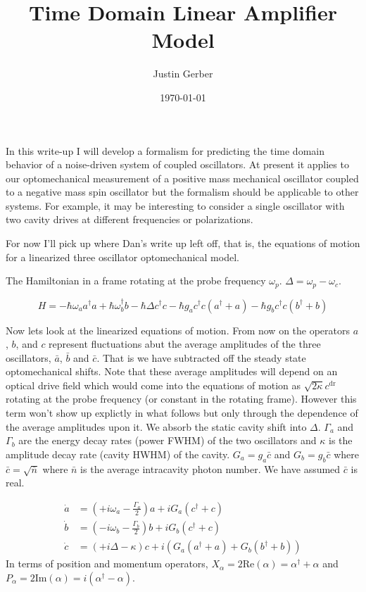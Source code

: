\documentclass[12pt]{article}
\begin{document}
\title{Time Domain Linear Amplifier Model}
\author{Justin Gerber}
\date{\today}
\maketitle

In this write-up I will develop a formalism for predicting the time domain behavior of a noise-driven system of coupled oscillators. At present it applies to our optomechanical measurement of a positive mass mechanical oscillator coupled to a negative mass spin oscillator but the formalism should be applicable to other systems. For example, it may be interesting to consider a single oscillator with two cavity drives at different frequencies or polarizations.


For now I'll pick up where Dan's write up left off, that is, the equations of motion for a linearized three oscillator optomechanical model.

The Hamiltonian in a frame rotating at the probe frequency $\omega_p$. $\Delta = \omega_p-\omega_c$.

\begin{equation}
H = -\hbar \omega_a a^{\dag} a + \hbar \omega_b^{\dag}b - \hbar\Delta c^{\dag} c - \hbar g_a c^{\dag}c(a^{\dag} +a) -\hbar g_b c^{\dag} c(b^{\dag}+b)
\end{equation}

Now lets look at the linearized equations of motion. From now on the operators $a$, $b$, and $c$ represent fluctuations abut the average amplitudes of the three oscillators, $\bar{a}$, $\bar{b}$ and $\bar{c}$. That is we have subtracted off the steady state optomechanical shifts. Note that these average amplitudes will depend on an optical drive field which would come into the equations of motion as $\sqrt{2\kappa}c^{\text{dr}}$ rotating at the probe frequency (or constant in the rotating frame). However this term won't show up explictly in what follows but only through the dependence of the average amplitudes upon it. We absorb the static cavity shift into $\Delta$. $\Gamma_a$ and $\Gamma_b$ are the energy decay rates (power FWHM) of the two oscillators and $\kappa$ is the amplitude decay rate (cavity HWHM) of the cavity. $G_a = g_a \bar{c}$ and $G_b = g_b \bar{c}$ where $\bar{c} = \sqrt{\bar{n}}$ where $\bar{n}$ is the average intracavity photon number. We have assumed $\bar{c}$ is real.

\begin{align*}
\dot{a} &= \left(+i \omega_a - \frac{\Gamma_a}{2}\right)a + i G_a(c^{\dag} +c)\\
\dot{b}&= \left(-i \omega_b - \frac{\Gamma_b}{2}\right)b + i G_b(c^{\dag} +c)\\
\dot{c}&= \left(+i \Delta - \kappa\right) c + i(G_a(a^{\dag}+a)+G_b(b^{\dag}+b))
\end{align*}
In terms of position and momentum operators, $X_{\alpha} = 2\text{Re}(\alpha) = \alpha^{\dag}+\alpha$ and $P_{\alpha} = 2\text{Im}(\alpha) = i(\alpha^{\dag}-\alpha)$.
\end{document}
